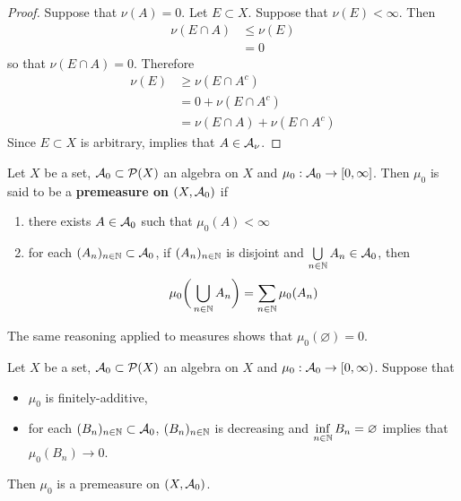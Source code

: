 \documentclass{book}
\begin{document}
	\begin{proof}
		Suppose that $\nu(A) = 0$. Let $E \subset X$. Suppose that $\nu(E) < \infty$. Then 
		\begin{align*}
			\nu(E \cap A) 
			& \leq \nu(E) \\
			& = 0
		\end{align*}
		so that $\nu(E \cap A) = 0$. Therefore
		\begin{align*}
			\nu(E)
			& \geq \nu(E \cap A^c) \\
			& = 0 + \nu(E \cap A^c) \\
			& = \nu(E \cap A) + \nu(E \cap A^c) 
		\end{align*}
		Since $E \subset X$ is arbitrary,  implies that $A \in \mathcal{A}_{\nu}$.
	\end{proof}
	
	\begin{defn}  
		Let $X$ be a set, $\mathcal{A}_0 \subset \mathcal{P}(X)$ an algebra on $X$ and $\mu_0:\mathcal{A}_0 \rightarrow [0, \infty]$. Then $\mu_0$ is said to be a \textbf{premeasure on $(X,\mathcal{A}_0)$} if 
		\begin{enumerate}
			\item there exists $A \in \mathcal{A}_0$ such that $\mu_0(A)< \infty$
			\item for each $(A_n)_{n \in \mathbb{N}} \subset \mathcal{A}_0$, if $(A_n)_{n \in \mathbb{N}}$ is disjoint and $\bigcup\limits_{n \in \mathbb{N}}A_n \in \mathcal{A}_0$, then $$\mu_0 \bigg(\bigcup_{n\in \mathbb{N}}A_n \bigg) = \sum_{n \in \mathbb{N}}\mu_0(A_n)$$
		\end{enumerate}
	\end{defn}
	
	\begin{note}
		The same reasoning applied to measures shows that $\mu_0(\varnothing) = 0$.
	\end{note}

	\begin{ex} 
		Let $X$ be a set, $\mathcal{A}_0 \subset \mathcal{P}(X)$ an algebra on $X$ and $\mu_0:\mathcal{A}_0 \rightarrow [0,\infty)$. Suppose that
		\begin{itemize}
			\item $\mu_0$ is finitely-additive,
			\item for each $(B_n)_{n \in \mathbb{N}} \subset \mathcal{A}_0$, $(B_n)_{n \in \mathbb{N}} $ is decreasing and $\inf\limits_{n \in \mathbb{N}} B_n = \varnothing$ implies that $\mu_0(B_n) \rightarrow 0$.
		\end{itemize}  
		Then $\mu_0$ is a premeasure on $(X, \mathcal{A}_0)$.
	\end{ex}
	
\end{document}
